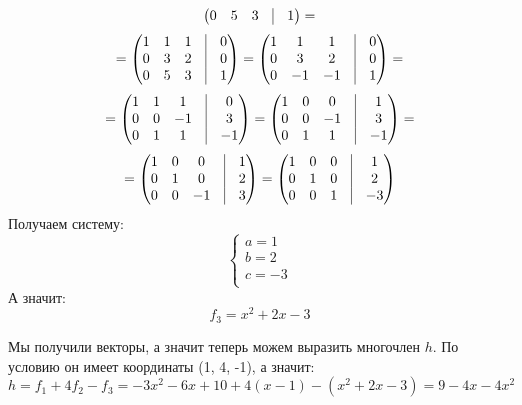 \documentclass[a4paper,12pt]{article}
\begin{document}
\begin{enumerate}
\[\begin{pmatrix}
0 & 5 & 3 & \vrule &1  \\
\end{pmatrix}
=
\]
\[
=
\begin{pmatrix}
1 & 1 & 1 & \vrule &0  \\
0 & 3 & 2 & \vrule &0  \\
0 & 5 & 3 & \vrule &1  \\
\end{pmatrix}
=
\begin{pmatrix}
1 & 1 & 1 & \vrule &0 \\
0 & 3 & 2 & \vrule &0  \\
0 & -1 & -1 & \vrule &1  \\
\end{pmatrix}
=
\]
\[
=
\begin{pmatrix}
1 & 1 & 1 & \vrule &0  \\
0 & 0 & -1 & \vrule &3  \\
0 & 1 & 1 & \vrule &-1  \\
\end{pmatrix}
=
\begin{pmatrix}
1 & 0 & 0 & \vrule &1  \\
0 & 0 & -1 & \vrule &3  \\
0 & 1 & 1 & \vrule &-1 \\
\end{pmatrix}
=
\]
\[
=
\begin{pmatrix}
1 & 0 & 0 & \vrule &1 \\
0 & 1 & 0 & \vrule &2  \\
0 & 0 & -1 & \vrule &3 \\
\end{pmatrix}
=
\begin{pmatrix}
1 & 0 & 0 & \vrule &1 \\
0 & 1 & 0 & \vrule &2 \\
0 & 0 & 1& \vrule &-3 \\
\end{pmatrix}
\]
Получаем систему:
\[
\begin{cases}
a = 1 \\ b = 2 \\ c = -3\\
\end{cases}
\]
А значит:
\[
f_3 = x^2 +2x - 3
\]
\end{enumerate}
Мы получили векторы, а значит теперь можем выразить многочлен $h$. По условию он имеет координаты (1, 4, -1), а значит:
\[
h = f_1 + 4f_2 - f_3 = -3x^2 - 6x + 10 + 4(x-1) -(x^2 + 2x -3) = 9 -4x -4x^2
\]
\\\\
\end{document}
